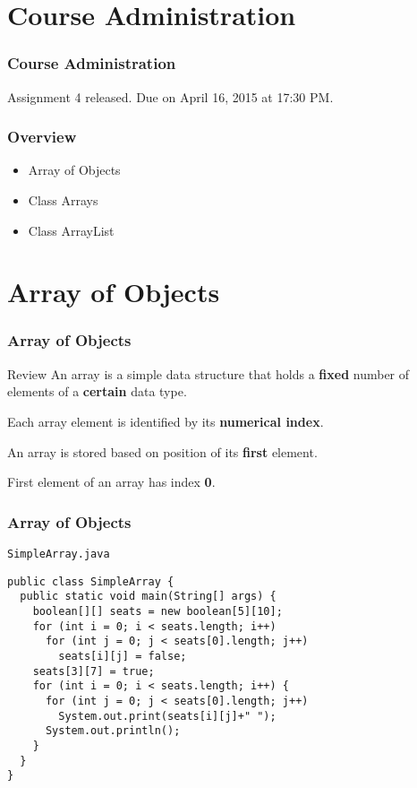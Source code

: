\documentclass[10pt, compress]{beamer}
\begin{document}
\prepareCover

\section{Course Administration}

\begin{frame}[fragile]
\frametitle{Course Administration}
Assignment 4 released. Due on April 16, 2015 at 17:30 PM.
\end{frame}

\begin{frame}[fragile]
  \frametitle{Overview}
  \begin{itemize}
    \item[] Array of Objects
    \item[] Class Arrays
    \item[] Class ArrayList
  \end{itemize}
\end{frame}

\section{Array of Objects}

\begin{frame}[fragile]
  \frametitle{Array of Objects}
  \begin{block}{Review}
    An array is a simple data structure that holds a \textbf{fixed} number of elements of a \textbf{certain} data type.

    Each array element is identified by its \textbf{numerical index}.

    An array is stored based on position of its \textbf{first} element.

    First element of an array has index \textbf{0}.
  \end{block}
\end{frame}

\begin{frame}[fragile]
  \frametitle{Array of Objects}
  \begin{block}{\texttt{SimpleArray.java}}
    \begin{verbatim}
public class SimpleArray {
  public static void main(String[] args) {
    boolean[][] seats = new boolean[5][10];
    for (int i = 0; i < seats.length; i++)
      for (int j = 0; j < seats[0].length; j++)
        seats[i][j] = false;
    seats[3][7] = true;
    for (int i = 0; i < seats.length; i++) {
      for (int j = 0; j < seats[0].length; j++)
        System.out.print(seats[i][j]+" ");
      System.out.println();
    }
  }
}
    \end{verbatim}
  \end{block}
\end{frame}
\end{document}
